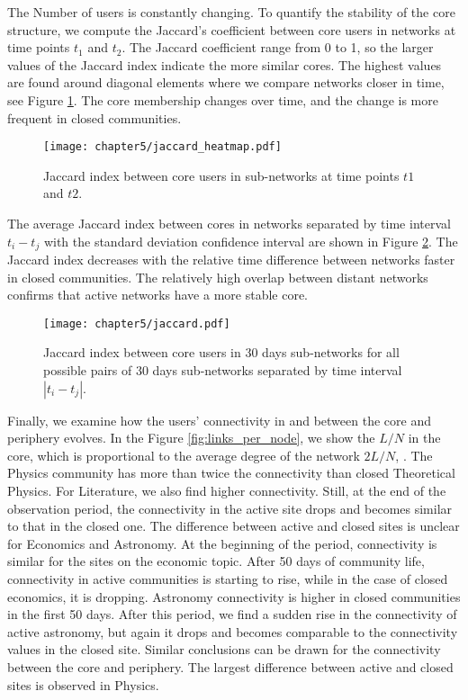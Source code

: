 The Number of users is constantly changing. To quantify the stability of the core structure, we compute the Jaccard’s coefficient between core users in networks at time points $t_1$ and $t_2$. The Jaccard coefficient range from 0 to 1, so the larger values of the Jaccard index indicate the more similar cores. 
The highest values are found around diagonal elements where we compare networks closer in time, see Figure \ref{fig:jaccard_hm}. The core membership changes over time, and the change is more frequent in closed communities. 

\begin{figure}[h!]
	\centering
	\texttt{[image: chapter5/jaccard\_heatmap.pdf]}
	\caption[Mean Jaccard index between core users.]{Jaccard index between core users in  sub-networks at time points $t1$ and $t2$.}
	\label{fig:jaccard_hm}
\end{figure}  

The average Jaccard index between cores in networks separated by time interval $t_i-t_j$ with the standard deviation confidence interval are shown in Figure \ref{fig:jaccard_mean}. The Jaccard index decreases with the relative time difference between networks faster in closed communities. The relatively high overlap between distant networks confirms that active networks have a more stable core. 

\begin{figure}[h!]
	\centering
	\texttt{[image: chapter5/jaccard.pdf]}
	\caption[Mean Jaccard index between core users.]{Jaccard index between core users in 30 days sub-networks for all possible pairs of 30 days sub-networks separated by time interval $|t_i - t_j|$.}
	\label{fig:jaccard_mean}
\end{figure}

Finally, we examine how the users’ connectivity in and between the core and periphery evolves. In the Figure \ref{fig:links_per_node}, we show the $L/N$ in the core, which is proportional to the average degree of the network $2L/N$, . The Physics community has more than twice the connectivity than closed Theoretical Physics. For Literature, we also find higher connectivity. Still, at the end of the observation period, the connectivity in the active site drops and becomes similar to that in the closed one. The difference between active and closed sites is unclear for Economics and Astronomy. At the beginning of the period, connectivity is similar for the sites on the economic topic. After 50 days of community life, connectivity in active communities is starting to rise, while in the case of closed economics, it is dropping. Astronomy connectivity is higher in closed communities in the first 50 days. After this period, we find a sudden rise in the connectivity of active astronomy, but again it drops and becomes comparable to the connectivity values in the closed site. Similar conclusions can be drawn for the connectivity between the core and periphery. The largest difference between active and closed sites is observed in Physics.  


